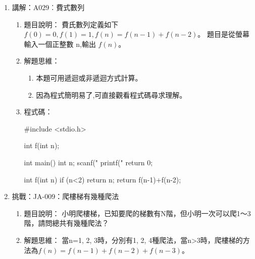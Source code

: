 \begin{enumerate}
\begin{enumerate}
\begin{comment}
			\end{cppcode}
\end{comment}
		\end{enumerate}
	
	\item 講解：A029︰費式數列
		\begin{enumerate}
			\item 題目說明：
			\subitem 費氏數列定義如下 $f(0)=0, f(1)=1, f(n)=f(n-1)+f(n-2)$。
			題目是從螢幕輸入一個正整數 n,輸出 $f(n)$。
			
			\item 解題思維：
			\begin{enumerate}
				\item 本題可用遞迴或非遞迴方式計算。
				\item 因為程式簡明易了,可直接觀看程式碼尋求理解。
			\end{enumerate}
			
			\item 程式碼：
			\begin{cppcode}
				#include <stdio.h>

				int f(int n);

				int main()
				{
					int n;
					scanf("%
					printf("%
					return 0;
				}

				int f(int n)
				{
					if (n<2) return n;
					return f(n-1)+f(n-2);
				}
			\end{cppcode}
		\end{enumerate}
	
	\item 挑戰：JA-009：爬樓梯有幾種爬法
		\begin{enumerate}
			\item 題目說明：
			\subitem 小明爬樓梯，已知要爬的梯數有N階，但小明一次可以爬1～3階，請問總共有幾種爬法？
			
			\item 解題思維：
			\subitem
			當n=1, 2, 3時，分別有1, 2, 4種爬法，當n>3時，爬樓梯的方法為$f(n)=f(n-1)+f(n-2)+f(n-3)$。
\begin{comment}			
			\item 程式碼：
			\begin{cppcode}
				#include <cstdio>
				
				int f(int n);
				
				int main()
				{
					int n;
					scanf("%
					printf("%
					return 0;
				}
				
				int f(int n)
				{
					if (n==1) return 1;
					if (n==2) return 2;
					if (n==3) return 4;
					return f(n-1)+f(n-2)+f(n-3);
				}
			\end{cppcode}
\end{comment}
		\end{enumerate}
	

\end{enumerate}
